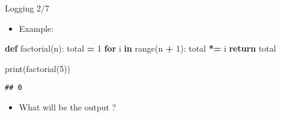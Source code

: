 \documentclass[
  8pt,
  ignorenonframetext,
]{beamer}
\newenvironment{Shaded}{\begin{snugshade}}{\end{snugshade}}
\newcommand{\BuiltInTok}[1]{#1}
\newcommand{\ControlFlowTok}[1]{\textcolor[rgb]{0.13,0.29,0.53}{\textbf{#1}}}
\newcommand{\DecValTok}[1]{\textcolor[rgb]{0.00,0.00,0.81}{#1}}
\newcommand{\KeywordTok}[1]{\textcolor[rgb]{0.13,0.29,0.53}{\textbf{#1}}}
\newcommand{\NormalTok}[1]{#1}
\newcommand{\OperatorTok}[1]{\textcolor[rgb]{0.81,0.36,0.00}{\textbf{#1}}}
\providecommand{\tightlist}{%
  \setlength{\itemsep}{0pt}\setlength{\parskip}{0pt}}
\begin{document}
\begin{frame}[fragile]{Logging 2/7}
\protect\hypertarget{logging-27-1}{}
\begin{itemize}
\tightlist
\item
  Example:
\end{itemize}

\begin{Shaded}
\begin{Highlighting}[]
\KeywordTok{def}\NormalTok{ factorial(n):}
\NormalTok{    total }\OperatorTok{=} \DecValTok{1}
    \ControlFlowTok{for}\NormalTok{ i }\KeywordTok{in} \BuiltInTok{range}\NormalTok{(n }\OperatorTok{+} \DecValTok{1}\NormalTok{):}
\NormalTok{        total }\OperatorTok{*=}\NormalTok{ i}
    \ControlFlowTok{return}\NormalTok{ total}

\BuiltInTok{print}\NormalTok{(factorial(}\DecValTok{5}\NormalTok{))}
\end{Highlighting}
\end{Shaded}

\begin{verbatim}
## 0
\end{verbatim}

\begin{itemize}
\tightlist
\item
  What will be the output ?
\end{itemize}
\end{frame}
\end{document}
